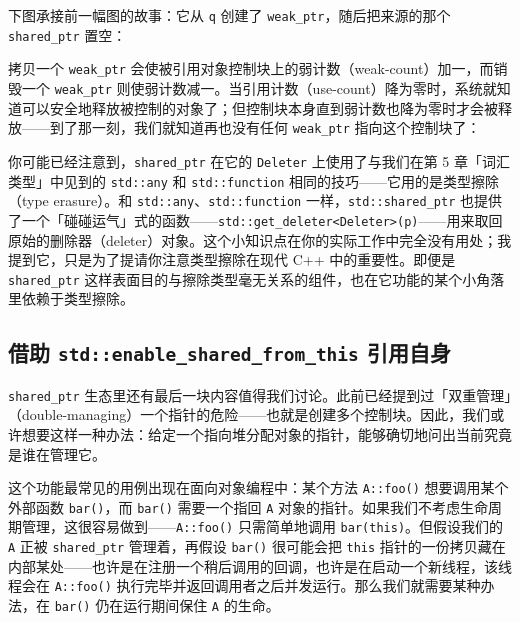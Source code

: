 下图承接前一幅图的故事：它从 \texttt{q} 创建了 \texttt{weak\_\allowbreak{}ptr}，随后把来源的那个 \texttt{shared\_\allowbreak{}ptr} 置空：


拷贝一个 \texttt{weak\_\allowbreak{}ptr} 会使被引用对象控制块上的弱计数（weak-count）加一，而销毁一个 \texttt{weak\_\allowbreak{}ptr} 则使弱计数减一。当引用计数（use-count）降为零时，系统就知道可以安全地释放被控制的对象了；但控制块本身直到弱计数也降为零时才会被释放——到了那一刻，我们就知道再也没有任何 \texttt{weak\_\allowbreak{}ptr} 指向这个控制块了：


你可能已经注意到，\texttt{shared\_\allowbreak{}ptr} 在它的 \texttt{Deleter} 上使用了与我们在第 5 章「词汇类型」中见到的 \texttt{std::\allowbreak{}any} 和 \texttt{std::\allowbreak{}function} 相同的技巧——它用的是类型擦除（type erasure）。和 \texttt{std::\allowbreak{}any}、\texttt{std::\allowbreak{}function} 一样，\texttt{std::\allowbreak{}shared\_\allowbreak{}ptr} 也提供了一个「碰碰运气」式的函数——\texttt{std::\allowbreak{}get\_\allowbreak{}deleter<\allowbreak{}Deleter>\allowbreak{}(\allowbreak{}p)\allowbreak{}}——用来取回原始的删除器（deleter）对象。这个小知识点在你的实际工作中完全没有用处；我提到它，只是为了提请你注意类型擦除在现代 C++ 中的重要性。即便是 \texttt{shared\_\allowbreak{}ptr} 这样表面目的与擦除类型毫无关系的组件，也在它功能的某个小角落里依赖于类型擦除。

\subsection{借助 \texttt{std::\allowbreak{}enable\_\allowbreak{}shared\_\allowbreak{}from\_\allowbreak{}this} 引用自身}

\texttt{shared\_\allowbreak{}ptr} 生态里还有最后一块内容值得我们讨论。此前已经提到过「双重管理」（double-managing）一个指针的危险——也就是创建多个控制块。因此，我们或许想要这样一种办法：给定一个指向堆分配对象的指针，能够确切地问出当前究竟是谁在管理它。

这个功能最常见的用例出现在面向对象编程中：某个方法 \texttt{A::\allowbreak{}foo(\allowbreak{})\allowbreak{}} 想要调用某个外部函数 \texttt{bar(\allowbreak{})\allowbreak{}}，而 \texttt{bar(\allowbreak{})\allowbreak{}} 需要一个指回 \texttt{A} 对象的指针。如果我们不考虑生命周期管理，这很容易做到——\texttt{A::\allowbreak{}foo(\allowbreak{})\allowbreak{}} 只需简单地调用 \texttt{bar(\allowbreak{}this)\allowbreak{}}。但假设我们的 \texttt{A} 正被 \texttt{shared\_\allowbreak{}ptr} 管理着，再假设 \texttt{bar(\allowbreak{})\allowbreak{}} 很可能会把 \texttt{this} 指针的一份拷贝藏在内部某处——也许是在注册一个稍后调用的回调，也许是在启动一个新线程，该线程会在 \texttt{A::\allowbreak{}foo(\allowbreak{})\allowbreak{}} 执行完毕并返回调用者之后并发运行。那么我们就需要某种办法，在 \texttt{bar(\allowbreak{})\allowbreak{}} 仍在运行期间保住 \texttt{A} 的生命。

